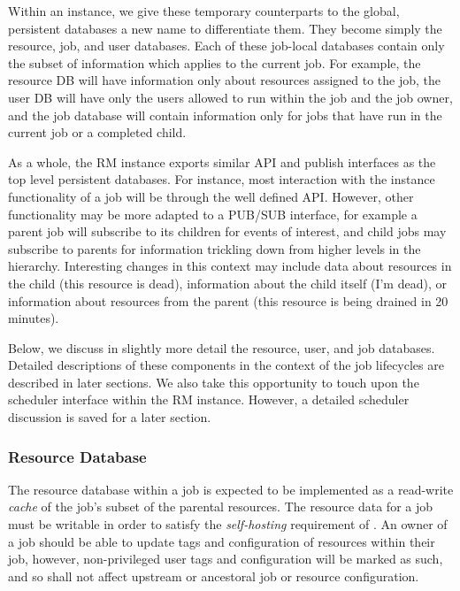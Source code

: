 Within an instance, we give these temporary counterparts to the
global, persistent databases a new name to differentiate them. They
become simply the resource, job, and user databases. Each of
these job-local databases contain only the subset of information
which applies to the current job. For example, the resource DB
will have information only about resources assigned to the job, the
user DB will have only the users allowed to run within the job and
the job owner, and the job database will contain information only
for jobs that have run in the current job or a completed child.

As a whole, the RM instance exports similar API and publish interfaces
as the top level persistent databases. For instance, most interaction
with the instance functionality of a job will be through the well
defined API. However, other functionality may be more adapted to
a PUB/SUB interface, for example a parent job will subscribe
to its children for events of interest, and child jobs may subscribe
to parents for information trickling down from higher levels in the
hierarchy. Interesting changes in this context may include data
about resources in the child (this resource is dead), information about
the child itself (I'm dead), or information about resources from
the parent (this resource is being drained in 20 minutes).
\ifcomments
{}
\fi

Below, we discuss in slightly more detail the resource, user, and
job databases. Detailed descriptions of these components in the
context of the job lifecycles are described in later sections.
We also take this opportunity to touch upon the
scheduler interface within the RM instance. However, a detailed
scheduler discussion is saved for a later section.

\subsubsection{Resource Database}

The resource database within a job is expected to be implemented as
a read-write \emph{cache} of the job's subset of the parental resources.
The resource data for a job must be writable in order to satisfy
the \emph{self-hosting} requirement of \ngrm. An owner of a job
should be able to update tags and configuration of resources within
their job, however, non-privileged user tags and configuration will
be marked as such, and so shall not affect upstream or ancestoral
job or resource configuration.

